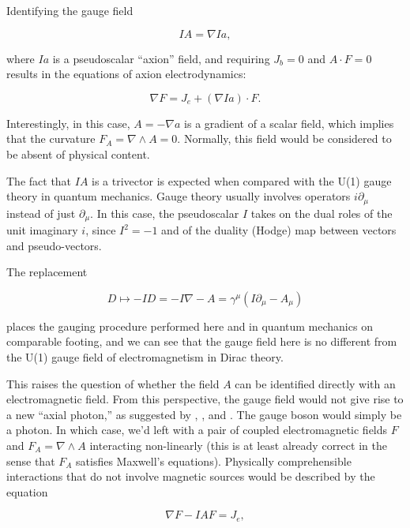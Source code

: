 \documentclass{article}
\begin{document}
  Identifying the gauge field

  \begin{equation}
    IA = \nabla I a,
  \end{equation}

  where $Ia$ is a pseudoscalar ``axion'' field, and requiring $J_b = 0$ and $A \cdot F = 0$ results in the equations of axion electrodynamics:

  \begin{equation}
    \nabla F = J_e + (\nabla I a) \cdot F.
  \end{equation}

  Interestingly, in this case, $A = -\nabla a$ is a gradient of a scalar field, which implies that the curvature $F_A = \nabla \wedge A = 0$. Normally, this field would be considered to be absent of physical content. 

  The fact that $IA$ is a trivector is expected when compared with the U(1) gauge theory in quantum mechanics. Gauge theory usually involves operators $i \partial_\mu$ instead of just $\partial_\mu$. In this case, the pseudoscalar $I$ takes on the dual roles of the unit imaginary $i$, since $I^2 = -1$ and of the duality (Hodge) map between vectors and pseudo-vectors.

  The replacement 

  \begin{equation}
    D \mapsto - I D = -I \nabla - A = \gamma^\mu (I \partial_\mu - A_\mu)
  \end{equation}

  places the gauging procedure performed here and in quantum mechanics on comparable footing, and we can see that the gauge field here is no different from the U(1) gauge field of electromagnetism in Dirac theory.

  This raises the question of whether the field $A$ can be identified directly with an electromagnetic field. From this perspective, the gauge field would not give rise to a new ``axial photon,'' as suggested by \cite{malik}, \cite{naik}, and \cite{pmn}. The gauge boson would simply be a photon. In which case, we'd left with a pair of coupled electromagnetic fields $F$ and $F_A = \nabla \wedge A$ interacting non-linearly (this is at least already correct in the sense that $F_A$ satisfies Maxwell's equations). Physically comprehensible interactions that do not involve magnetic sources would be described by the equation

  \begin{equation}
    \nabla F - I A F = J_e,
  \end{equation}
\end{document}
